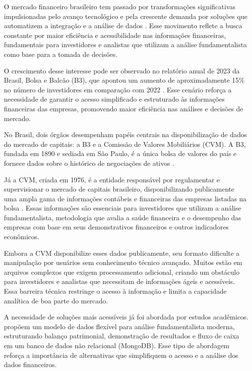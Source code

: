 O mercado financeiro brasileiro tem passado por transformações significativas impulsionadas pelo avanço tecnológico e pela crescente demanda por soluções que automatizem a integração e a análise de dados \cite{dantas:2020:comportamento}. Esse movimento reflete a busca constante por maior eficiência e acessibilidade nas informações financeiras, fundamentais para investidores e analistas que utilizam a análise fundamentalista como base para a tomada de decisões. 

O crescimento desse interesse pode ser observado no relatório anual de 2023 da Brasil, Bolsa e Balcão (B3), que apontou um aumento de aproximadamente 15\% no número de investidores em comparação com 2022 \cite{b3:2023:relatorio}. Esse cenário reforça a necessidade de garantir o acesso simplificado e estruturado às informações financeiras das empresas, promovendo maior eficiência nas análises e decisões de mercado.

No Brasil, dois órgãos desempenham papéis centrais na disponibilização de dados do mercado de capitais: a B3 e a Comissão de Valores Mobiliários (CVM). A B3, fundada em 1890 e sediada em São Paulo, é a única bolsa de valores do país e fornece dados sobre o histórico de negociações de ativos \cite{b3:2023:investidores}. 

Já a CVM, criada em 1976, é a entidade responsável por regulamentar e supervisionar o mercado de capitais brasileiro, disponibilizando publicamente uma ampla gama de informações contábeis e financeiras das empresas listadas na bolsa \cite{cvm:2009:informacao}. Essas informações são essenciais para investidores que utilizam a análise fundamentalista, metodologia que avalia a saúde financeira e o desempenho das empresas com base em seus demonstrativos financeiros e outros indicadores econômicos.

Embora a CVM disponibilize esses dados publicamente, seu formato dificulte a manipulação por usuários sem conhecimento técnico avançado. Muitos estão em arquivos complexos que exigem processamento adicional, criando um obstáculo para investidores e analistas que necessitam de informações ágeis e acessíveis. Essa barreira técnica restringe o acesso à informação e limita a capacidade analítica de boa parte do mercado.

A necessidade de soluções mais acessíveis já foi abordada por estudos acadêmicos. \cite{deAraujo:2021:modeloDados} propõem um modelo de dados flexível para análise fundamentalista moderna, estruturando balanço patrimonial, demonstração de resultados e fluxo de caixa em um banco de dados não relacional (MongoDB). Esse tipo de abordagem reforça a importância de alternativas que simplifiquem o acesso e a análise dos dados financeiros.


